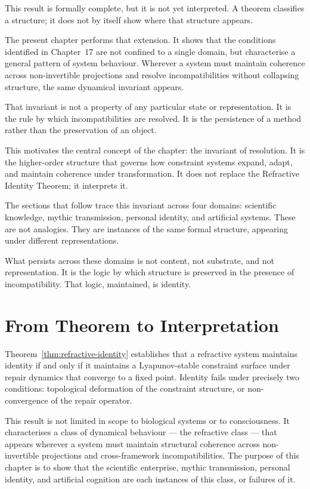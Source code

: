 \documentclass[11pt,openany]{book}
\begin{document}
This result is formally complete, but it is not yet
interpreted.  A theorem classifies a structure; it does not
by itself show where that structure appears.

The present chapter performs that extension.  It shows that
the conditions identified in Chapter~17 are not confined to
a single domain, but characterise a general pattern of
system behaviour.  Wherever a system must maintain
coherence across non-invertible projections and resolve
incompatibilities without collapsing structure, the same
dynamical invariant appears.

That invariant is not a property of any particular state or
representation.  It is the rule by which incompatibilities
are resolved.  It is the persistence of a method rather
than the preservation of an object.

This motivates the central concept of the chapter: the
invariant of resolution.  It is the higher-order structure
that governs how constraint systems expand, adapt, and
maintain coherence under transformation.  It does not
replace the Refractive Identity Theorem; it interprets it.

The sections that follow trace this invariant across four
domains: scientific knowledge, mythic transmission,
personal identity, and artificial systems.  These are not
analogies.  They are instances of the same formal
structure, appearing under different representations.

What persists across these domains is not content, not
substrate, and not representation.  It is the logic by
which structure is preserved in the presence of
incompatibility. That logic, maintained, is identity.

\section{From Theorem to Interpretation}
\label{sec:from-theorem}

Theorem~\ref{thm:refractive-identity} establishes that a
refractive system maintains identity if and only if it
maintains a Lyapunov-stable constraint surface under repair
dynamics that converge to a fixed point.  Identity fails
under precisely two conditions: topological deformation of
the constraint structure, or non-convergence of the repair
operator.

This result is not limited in scope to biological systems
or to consciousness.  It characterises a class of dynamical
behaviour --- the refractive class --- that appears wherever
a system must maintain structural coherence across
non-invertible projections and cross-framework
incompatibilities.  The purpose of this chapter is to show
that the scientific enterprise, mythic transmission,
personal identity, and artificial cognition are each
instances of this class, or failures of it.
\end{document}
